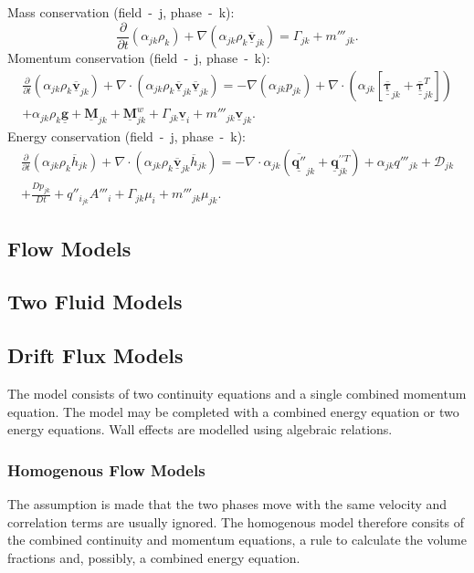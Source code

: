 Mass conservation (field~-~j, phase~-~k):
\begin{equation}
	\frac{\partial}{\partial t}(\alpha_{jk} \rho_{k}) + \nabla (\alpha_{jk} \rho_{k} \overline{\mathbf{\underline{v}}}_{jk}) = \Gamma_{jk} + m'''_{jk}.
\end{equation}
Momentum conservation (field~-~j, phase~-~k):
\begin{multline}
	\frac{\partial}{\partial t}(\alpha_{jk} \rho_{k} \overline{\mathbf{\underline{v}}}_{jk}) + \nabla \cdot (\alpha_{jk} \rho_{k} \overline{\mathbf{\underline{v}}}_{jk} \overline{\mathbf{\underline{v}}}_{jk}) = 
	-\nabla(\alpha_{jk} p_{jk}) + \nabla \cdot (\alpha_{jk} [\underline{\underline{\overline{\mathbf{\tau}}}}_{jk} + \underline{\underline{\overline{\mathbf{\tau}}}}_{jk}^{T}])\\
	+ \alpha_{jk} \rho_{k} \underline{\mathbf{g}} + \underline{\mathbf{M}}_{jk} + \underline{\mathbf{M}}_{jk}^{w} + \Gamma_{jk}\underline{\mathbf{v}}_{i} + m'''_{jk} \underline{\mathbf{v}}_{jk}.
\end{multline}
Energy conservation (field~-~j, phase~-~k):
\begin{multline}
	\frac{\partial}{\partial t}(\alpha_{jk} \rho_{k} \overline{h}_{jk}) + \nabla \cdot (\alpha_{jk} \rho_{k} \overline{\mathbf{\underline{v}}}_{jk} \overline{h}_{jk})
	= -\nabla \cdot \alpha_{jk}(\overline{\underline{\mathbf{q}''}}_{jk} + \underline{\mathbf{q}}^{\prime \prime T}_{jk}) + \alpha_{jk} q'''_{jk} + \mathcal{D}_{jk}\\
	+ \frac{D p_{jk}}{D t} + q''_{i_{jk}} A'''_{i} + \Gamma_{jk}\mu_{i} + m'''_{jk} \mu_{jk}.
\end{multline}
\subsection{Flow Models}
\subsection{Two Fluid Models}
\subsection{Drift Flux Models}
The model consists of two continuity equations and a single combined momentum equation. The model may be completed with a combined energy equation or two energy equations. Wall effects are modelled using algebraic relations.~\cite{tryggvasonDirectNumericalSimulations2011}
\subsubsection{Homogenous Flow Models}
The assumption is made that the two phases move with the same velocity and correlation terms are usually ignored. The homogenous model therefore consits of the combined continuity and momentum equations, a rule to calculate the volume fractions and, possibly, a combined energy equation.~\cite{tryggvasonDirectNumericalSimulations2011}

